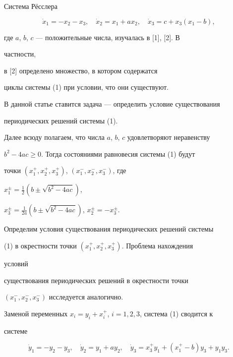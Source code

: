  


Система Р\"е{}сслера 


\begin{equation} 


\Dot x_1=-x_2-x_3,\quad 


\Dot x_2=x_1+ax_2,\quad \Dot x_3=c+x_3(x_1-b), 


\end{equation} 


где $a$, $b$, $c$ --- положительные числа, изучалась в [1], [2]. В 


частности,


в [2] определено множество, в котором содержатся 


циклы системы (1) при условии, что они существуют. 


 


В данной статье ставится задача --- определить условие существования 


периодических решений системы (1). 


Далее всюду полагаем, что числа $a$, $b$, $c$ удовлетворяют неравенству 


$b^2-4ac\ge 0$. Тогда состояниями равновесия системы (1) будут 


точки $(x^+_1,x^+_2,x^+_3)$, $(x^-_1,x^-_2,x^-_3)$, где 


$x^\pm_1=\frac{1}{2}(b\pm\sqrt{b^2-4ac})$, 


$x^\pm_3=\frac{1}{2a}(b\pm\sqrt{b^2-4ac})$, $x^\pm_2=-x^\pm_3$. 


Определим условия существования периодических решений системы 


(1) в окрестности точки $(x^+_1,x^+_2,x^+_3)$. Проблема нахождения 


условий 


существования периодических решений в окрестности точки 


$(x^-_1,x^-_2,x^-_3)$ исследуется аналогично. 


 


Заменой переменных $x_i=y_i+x^+_i$, $i=1,2,3$, система (1) сводится к 


системе 


\begin{equation} 


\Dot y_1=-y_2-y_3,\quad 


\Dot y_2=y_1+ay_2,\quad 


\Dot y_3=x^+_3y_1+(x^+_1-b)y_3+y_1y_3. 


\end{equation} 


